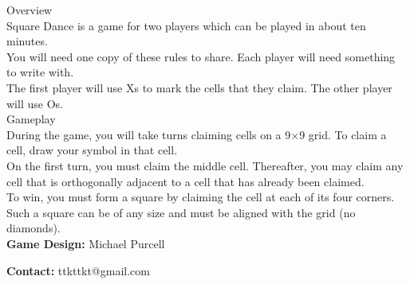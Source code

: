 \begin{minipage}{6cm}\raggedright
{\setmainfont[Scale=0.95]{Century Gothic-Bold}\LARGE Overview}\\[1.0ex]

\setmainfont{Tex Gyre Schola}
Square Dance is a game for two players which can be played in about ten minutes.\\[1.125ex]

You will need one copy of these rules to share. Each player will need something to write with.\\[1.125ex]

The first player will use {\setmainfont[Scale=0.95]{Century Gothic-Bold} X}s to mark the cells that they claim. The other player will use {\setmainfont[Scale=0.95]{Century Gothic-Bold} O}s.\\[2ex]

{\setmainfont[Scale=0.95]{Century Gothic-Bold}\LARGE Gameplay}\\[1.0ex]

During the game, you will take turns claiming cells on a 9$\times$9 grid. To claim a cell, draw your symbol in that cell.\\[1.125ex]

On the first turn, you must claim the middle cell. Thereafter, you may claim any cell that is orthogonally adjacent to a cell that has already been claimed.\\[1.125ex]

To win, you must form a square by claiming the cell at each of its four corners. Such a square can be of any size and must be aligned with the grid (no diamonds).\\[1.125ex]

\textbf{Game Design:} Michael Purcell

\textbf{Contact:} ttkttkt@gmail.com
\end{minipage}
